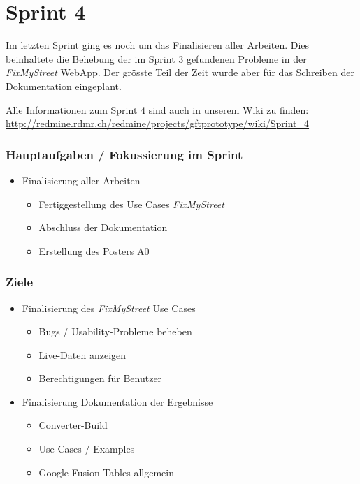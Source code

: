 \section{Sprint 4}

Im letzten Sprint ging es noch um das Finalisieren aller Arbeiten. Dies beinhaltete die Behebung der im Sprint 3 gefundenen Probleme in der \emph{FixMyStreet} \gls{WebApp}. Der grösste Teil der Zeit wurde aber für das Schreiben der Dokumentation eingeplant. 

Alle Informationen zum Sprint 4 sind auch in unserem Wiki zu finden:
\url{http://redmine.rdmr.ch/redmine/projects/gftprototype/wiki/Sprint_4}

\subsubsection{Hauptaufgaben / Fokussierung im Sprint}
\begin{itemize}
	\item Finalisierung aller Arbeiten
	\begin{itemize}
		\item Fertiggestellung des Use Cases \emph{FixMyStreet}
		\item Abschluss der Dokumentation
		\item Erstellung des Posters A0
	\end{itemize}
\end{itemize}

\subsubsection{Ziele}
\begin{itemize}
	\item Finalisierung des \emph{FixMyStreet} Use Cases
	\begin{itemize}
		\item Bugs / Usability-Probleme beheben
		\item Live-Daten anzeigen
		\item Berechtigungen für Benutzer
	\end{itemize}
	
	\item Finalisierung Dokumentation der Ergebnisse
	\begin{itemize}
		\item Converter-Build
		\item Use Cases / Examples
		\item Google Fusion Tables allgemein
	\end{itemize}
\end{itemize}

